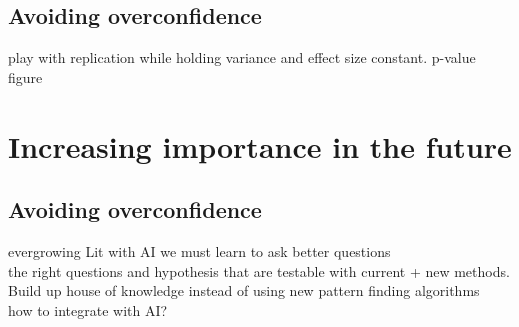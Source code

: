 \documentclass{article}
\begin{document}
			\subsection*{Avoiding overconfidence}
			play with replication while holding variance and effect size constant. p-value figure\\
	
\section*{Increasing importance in the future}

			\subsection*{Avoiding overconfidence}
			evergrowing Lit
			with AI we must learn to ask better questions\\
			the right questions and hypothesis that are testable with current + new methods. Build up house of knowledge instead of using new pattern finding algorithms\\
			how to integrate with AI?\\
	
\end{document}
